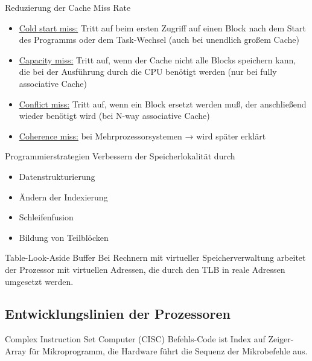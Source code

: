 \begin{defi}{Reduzierung der Cache Miss Rate}
  \begin{itemize}
    \item \underline{Cold start miss:} Tritt auf beim ersten Zugriff auf einen Block nach dem Start des Programms oder dem Task-Wechsel (auch bei unendlich großem Cache)
    \item \underline{Capacity miss:} Tritt auf, wenn der Cache nicht alle Blocks speichern kann, die bei der Ausführung durch die CPU benötigt werden (nur bei fully associative Cache)
    \item \underline{Conflict miss:} Tritt auf, wenn ein Block ersetzt werden muß, der anschließend wieder benötigt wird (bei N-way associative Cache)
    \item \underline{Coherence miss:} bei Mehrprozessorsystemen → wird später erklärt
  \end{itemize}
\end{defi}

\begin{defi}{Programmierstrategien}
  Verbessern der Speicherlokalität durch
  \begin{itemize}[\ldots]
    \item Datenstrukturierung
    \item Ändern der Indexierung
    \item Schleifenfusion
    \item Bildung von Teilblöcken
  \end{itemize}
\end{defi}

\begin{defi}{Table-Look-Aside Buffer}
  Bei Rechnern mit virtueller Speicherverwaltung arbeitet der Prozessor mit virtuellen Adressen,
  die durch den TLB in reale Adressen umgesetzt werden.
\end{defi}

\subsection{Entwicklungslinien der Prozessoren}\label{subsec:entwicklungslinien-der-prozessoren}

\begin{defi}{Complex Instruction Set Computer (CISC)}
  Befehls-Code ist Index auf Zeiger-Array für Mikroprogramm,
  die Hardware führt die Sequenz der Mikrobefehle aus.
\end{defi}

